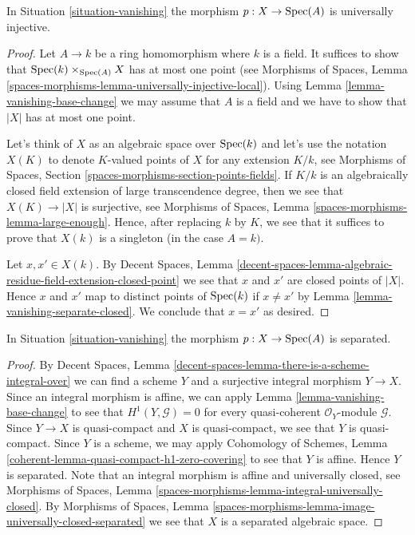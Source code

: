 \begin{lemma}
\label{lemma-vanishing-injective}
In Situation \ref{situation-vanishing} the morphism $p : X \to \mathop{\mathrm{Spec}}(A)$ is
universally injective.
\end{lemma}

\begin{proof}
Let $A \to k$ be a ring homomorphism where $k$ is a field. It suffices to
show that $\mathop{\mathrm{Spec}}(k) \times_{\mathop{\mathrm{Spec}}(A)} X$ has at most one point (see
Morphisms of Spaces, Lemma
\ref{spaces-morphisms-lemma-universally-injective-local}).
Using Lemma \ref{lemma-vanishing-base-change} we may assume that $A$
is a field and we have to show that $|X|$ has at most one point.

\medskip\noindent
Let's think of $X$ as an algebraic space over $\mathop{\mathrm{Spec}}(k)$ and let's
use the notation $X(K)$ to denote $K$-valued points of $X$
for any extension $K/k$, see
Morphisms of Spaces, Section \ref{spaces-morphisms-section-points-fields}.
If $K/k$ is an algebraically closed field extension
of large transcendence degree, then we see that $X(K) \to |X|$
is surjective, see Morphisms of Spaces, Lemma
\ref{spaces-morphisms-lemma-large-enough}. Hence, after replacing $k$
by $K$, we see that it suffices to prove that $X(k)$ is a singleton
(in the case $A = k)$.

\medskip\noindent
Let $x, x' \in X(k)$. By Decent Spaces, Lemma
\ref{decent-spaces-lemma-algebraic-residue-field-extension-closed-point}
we see that $x$ and $x'$ are closed points of $|X|$. Hence $x$ and $x'$
map to distinct points of $\mathop{\mathrm{Spec}}(k)$ if $x \not = x'$ by
Lemma \ref{lemma-vanishing-separate-closed}. We conclude that
$x = x'$ as desired.
\end{proof}

\begin{lemma}
\label{lemma-vanishing-separated}
In Situation \ref{situation-vanishing} the morphism $p : X \to \mathop{\mathrm{Spec}}(A)$ is
separated.
\end{lemma}

\begin{proof}
By Decent Spaces, Lemma
\ref{decent-spaces-lemma-there-is-a-scheme-integral-over}
we can find a scheme $Y$ and a surjective integral morphism
$Y \to X$. Since an integral morphism is affine, we can apply
Lemma \ref{lemma-vanishing-base-change}
to see that $H^1(Y, \mathcal{G}) = 0$ for every
quasi-coherent $\mathcal{O}_Y$-module $\mathcal{G}$.
Since $Y \to X$ is quasi-compact and $X$ is quasi-compact,
we see that $Y$ is quasi-compact.
Since $Y$ is a scheme, we may apply
Cohomology of Schemes, Lemma
\ref{coherent-lemma-quasi-compact-h1-zero-covering}
to see that $Y$ is affine. Hence $Y$ is separated.
Note that an integral morphism is affine and universally closed, see
Morphisms of Spaces, Lemma
\ref{spaces-morphisms-lemma-integral-universally-closed}.
By Morphisms of Spaces, Lemma
\ref{spaces-morphisms-lemma-image-universally-closed-separated}
we see that $X$ is a separated algebraic space.
\end{proof}

